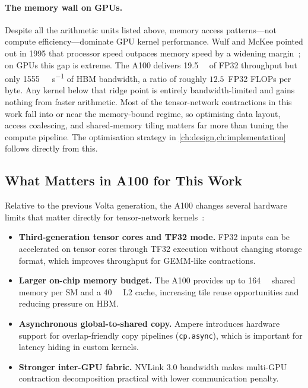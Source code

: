 \paragraph{The memory wall on GPUs.}
Despite all the arithmetic units listed above, memory access patterns---not
compute efficiency---dominate GPU kernel performance. Wulf and McKee pointed
out in 1995 that processor speed outpaces memory speed by a widening
margin~\cite{wulf1995memory-wall}; on GPUs this gap is extreme. The A100
delivers \SI{19.5}{\tera\flops} of FP32 throughput but only
\SI{1555}{\giga\byte\per\second} of HBM bandwidth, a ratio of roughly
$12.5$~FP32 FLOPs per byte. Any kernel below that ridge point is entirely
bandwidth-limited and gains nothing from faster arithmetic. Most of the
tensor-network contractions in this work fall into or near the memory-bound
regime, so optimising data layout, access coalescing, and shared-memory tiling
matters far more than tuning the compute pipeline. The optimisation strategy
in \cref{ch:design,ch:implementation} follows directly from this.

\subsection{What Matters in A100 for This Work}\label{sec:a100-whats-new}

Relative to the previous Volta generation, the A100 changes several hardware
limits that matter directly for tensor-network kernels~\cite{nvidia2020a100,nvidia-ampere-tuning-guide}:
\begin{itemize}
  \item \textbf{Third-generation tensor cores and TF32 mode.} FP32 inputs can be
    accelerated on tensor cores through TF32 execution without changing storage
    format, which improves throughput for GEMM-like contractions.
  \item \textbf{Larger on-chip memory budget.} The A100 provides up to
    \SI{164}{\kilo\byte} shared memory per SM and a \SI{40}{\mega\byte} L2
    cache, increasing tile reuse opportunities and reducing pressure on HBM.
  \item \textbf{Asynchronous global-to-shared copy.} Ampere introduces hardware
    support for overlap-friendly copy pipelines (\texttt{cp.async}), which is
    important for latency hiding in custom kernels.
  \item \textbf{Stronger inter-GPU fabric.} NVLink 3.0 bandwidth makes
    multi-GPU contraction decomposition practical with lower communication
    penalty.
\end{itemize}

